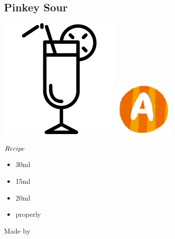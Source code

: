 \subsection{Pinkey Sour}
\vspace{-7.5mm}
\hspace{36mm}
\includegraphics[scale=.07]{cocktail_glass_tall.png}
\includegraphics[scale=.12]{capital_a.png}
\vspace{2.5mm}
\begin{itembox}[l]{\boldmath $Recipe$}
\begin{itemize}
\setlength{\parskip}{0cm}
\setlength{\itemsep}{0cm}
\item \campari 30ml
\item \vodka 15ml
\item \mj 20ml
\item \ga properly
\end{itemize}
\vspace{-4mm}
Made by \build
\end{itembox}
